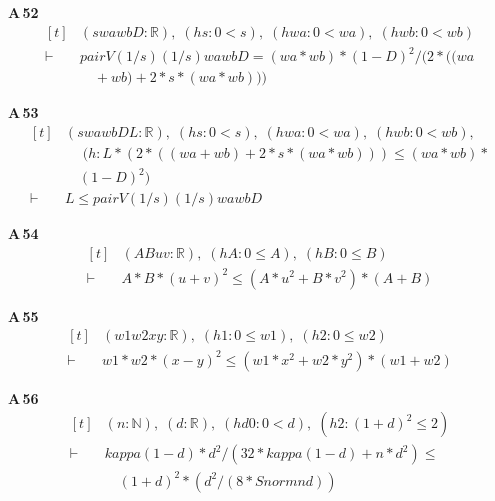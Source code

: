 \noindent\textbf{A\,52}\quad{}
{\footnotesize\[ \begin{aligned}[t]
&(\mathit{s} \mathit{wa} \mathit{wb} \mathit{D} : \mathbb{R} ),\; (\mathit{hs} : 0 < \mathit{s}),\; (\mathit{hwa} : 0 < \mathit{wa}),\; (\mathit{hwb} : 0 < \mathit{wb})\\
\vdash\;&\mathit{pairV} (1/\mathit{s}) (1/\mathit{s}) \mathit{wa} \mathit{wb} \mathit{D} = (\mathit{wa}*\mathit{wb})*(1-\mathit{D})^{2}/(2*((\mathit{wa}\\
&\quad +\mathit{wb}) + 2*\mathit{s}*(\mathit{wa}*\mathit{wb})))
\end{aligned} \]}

\noindent\textbf{A\,53}\quad{}
{\footnotesize\[ \begin{aligned}[t]
&(\mathit{s} \mathit{wa} \mathit{wb} \mathit{D} \mathit{L} : \mathbb{R} ),\; (\mathit{hs} : 0 < \mathit{s}),\; (\mathit{hwa} : 0 < \mathit{wa}),\; (\mathit{hwb} : 0 < \mathit{wb}),\\
&\quad \; (\mathit{h} : \mathit{L}*(2*((\mathit{wa}+\mathit{wb}) + 2*\mathit{s}*(\mathit{wa}*\mathit{wb}))) \leq (\mathit{wa}*\mathit{wb})*\\
&\quad (1-\mathit{D})^{2})\\
\vdash\;&\mathit{L} \leq \mathit{pairV} (1/\mathit{s}) (1/\mathit{s}) \mathit{wa} \mathit{wb} \mathit{D}
\end{aligned} \]}

\noindent\textbf{A\,54}\quad{}
{\footnotesize\[ \begin{aligned}[t]
&(\mathit{A} \mathit{B} \mathit{u} \mathit{v} : \mathbb{R} ),\; (\mathit{hA} : 0 \leq \mathit{A}),\; (\mathit{hB} : 0 \leq \mathit{B})\\
\vdash\;&\mathit{A}*\mathit{B}*(\mathit{u}+\mathit{v})^{2} \leq (\mathit{A}*\mathit{u}^{2} + \mathit{B}*\mathit{v}^{2})*(\mathit{A}+\mathit{B})
\end{aligned} \]}

\noindent\textbf{A\,55}\quad{}
{\footnotesize\[ \begin{aligned}[t]
&(\mathit{w1} \mathit{w2} \mathit{x} \mathit{y} : \mathbb{R} ),\; (\mathit{h1} : 0 \leq \mathit{w1}),\; (\mathit{h2} : 0 \leq \mathit{w2})\\
\vdash\;&\mathit{w1}*\mathit{w2}*(\mathit{x}-\mathit{y})^{2} \leq (\mathit{w1}*\mathit{x}^{2} + \mathit{w2}*\mathit{y}^{2})*(\mathit{w1}+\mathit{w2})
\end{aligned} \]}

\noindent\textbf{A\,56}\quad{}
{\footnotesize\[ \begin{aligned}[t]
&(\mathit{n} : \mathbb{N} ),\; (\mathit{d} : \mathbb{R} ),\; (\mathit{hd0} : 0 < \mathit{d}),\; (\mathit{h2} : (1+\mathit{d})^{2} \leq 2)\\
\vdash\;&\mathit{kappa} (1-\mathit{d})*\mathit{d}^{2}/(32*\mathit{kappa} (1-\mathit{d}) + \mathit{n}*\mathit{d}^{2}) \leq\\
&\quad (1+\mathit{d})^{2}*(\mathit{d}^{2}/(8*\mathit{Snorm} \mathit{n} \mathit{d}))
\end{aligned} \]}

